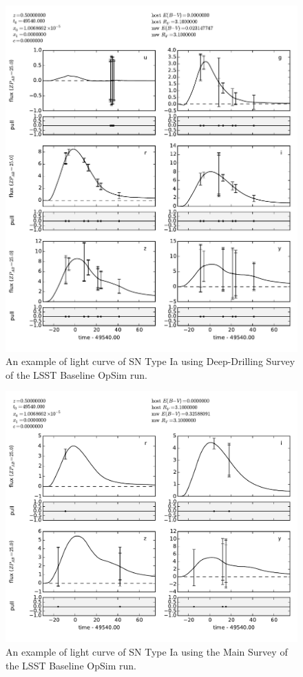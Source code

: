 \begin{figure}[tbh!]
\includegraphics[angle=0,width=14truecm]{figs/SN_290_lc.pdf}
\caption{An example of light curve of SN Type Ia using Deep-Drilling Survey of the LSST Baseline OpSim run.
}
\label{fig:SNIaLCopsimdeep}
\end{figure}



\begin{figure}[tbh!]
\includegraphics[angle=0,width=0.99\hsize:,clip]{figs/SN_309_lc.pdf}
\caption{An example of light curve of SN Type Ia using the Main Survey of the LSST Baseline OpSim
run.
}
\label{fig:SNIaLCopsimmain}
\end{figure}

